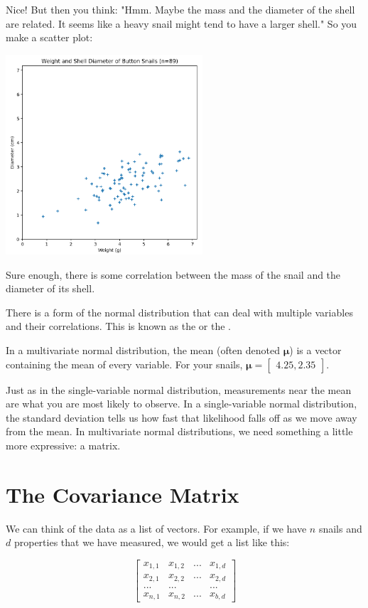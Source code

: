 Nice! But then you think: "Hmm. Maybe the mass and the diameter of the shell are related. It seems like a heavy snail might tend to have a larger shell."  So you make a scatter plot:

\includegraphics[width=0.55\textwidth]{scatter.png}

Sure enough, there is some correlation between the mass of the snail and the diameter of its shell.

There is a form of the normal distribution that can deal with multiple variables and their correlations.
This is known as the  or the .

In a multivariate normal distribution, the mean (often denoted $\boldsymbol\mu$) is a vector containing the mean of every variable.
For your snails, $\boldsymbol\mu = \begin{bmatrix} 4.25, 2.35 \end{bmatrix}$.

Just as in the single-variable normal distribution, measurements near the mean are what you are most likely to observe.
In a single-variable normal distribution, the standard deviation tells us how fast that likelihood falls off as we move away from the mean.
In multivariate normal distributions, we need something a little more expressive: a matrix.

\section{The Covariance Matrix}

We can think of the data as a list of vectors.
For example, if we have $n$ snails and $d$ properties that we have measured, we would get a list like this:

$$\begin{bmatrix}
x_{1,1} & x_{1,2} & ... & x_{1,d} \\
x_{2,1} & x_{2,2} & ... & x_{2,d} \\
... & ... & &... \\
x_{n,1} & x_{n,2} & ... & x_{b,d}\end{bmatrix}$$


